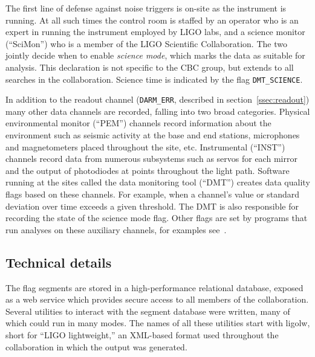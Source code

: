 The first line of defense against noise triggers is on-site as the
instrument is running.  At all such times the control room is staffed
by an operator who is an expert in running the instrument employed by
LIGO labs, and a science monitor (``SciMon'') who is a member of the
LIGO Scientific Collaboration.  The two jointly decide when to enable
\emph{science mode}, which marks the data as suitable for analysis.
This declaration is not specific to the CBC group, but extends to all
searches in the collaboration.  Science time is indicated by the flag
\texttt{DMT\_SCIENCE}.

In addition to the readout channel (\texttt{DARM\_ERR}, described in
section~\ref{ssec:readout}) many other data channels are recorded,
falling into two broad categories.  Physical environmental monitor
(``PEM'') channels record information about the environment such as
seismic activity at the base and end stations, microphones and
magnetometers placed throughout the site, etc.  Instrumental
(``INST'') channels record data from numerous subsystems such as
servos for each mirror and the output of photodiodes at points
throughout the light path.  Software running at the sites called the
data monitoring tool (``DMT'') creates data quality flags based on
these channels.  For example, when a channel's value or standard
deviation over time exceeds a given threshold.  The DMT is also
responsible for recording the state of the science mode flag.  Other
flags are set by programs that run analyses on these auxiliary
channels, for examples see~\cite{Isogai:2010}.



\iffalse
\subsection{Technical details}

The flag segments are stored in a high-performance relational
database, exposed as a web service which provides secure access to all
members of the collaboration.  Several utilities to interact with the
segment database were written, many of which could run in many modes.
The names of all these utilities start with ligolw, short for ``LIGO
lightweight,'' an XML-based format used throughout the collaboration
in which the output was generated.

